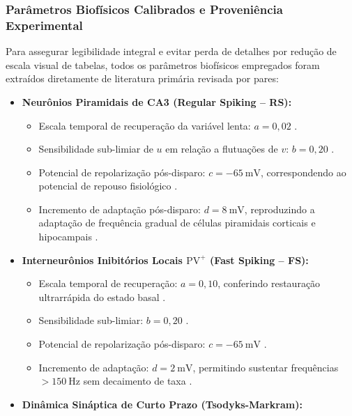 \documentclass[11pt,a4paper,article,brazil]{abntex2}
\begin{document}
\subsubsection{Parâmetros Biofísicos Calibrados e Proveniência Experimental}
\label{sec:parametros_biofisicos}
Para assegurar legibilidade integral e evitar perda de detalhes por redução de escala visual de tabelas, todos os parâmetros biofísicos empregados foram extraídos diretamente de literatura primária revisada por pares:
\begin{itemize}
    \item \textbf{Neurônios Piramidais de CA3 (Regular Spiking -- RS):}
          \begin{itemize}
              \item Escala temporal de recuperação da variável lenta: $a = 0{,}02$ \cite{izhikevich2003}.
              \item Sensibilidade sub-limiar de $u$ em relação a flutuações de $v$: $b = 0{,}20$ \cite{izhikevich2003}.
              \item Potencial de repolarização pós-disparo: $c = \qty{-65}{\milli\volt}$, correspondendo ao potencial de repouso fisiológico \cite{izhikevich2003}.
              \item Incremento de adaptação pós-disparo: $d = \qty{8}{\milli\volt}$, reproduzindo a adaptação de frequência gradual de células piramidais corticais e hipocampais \cite{izhikevich2003}.
          \end{itemize}
    \item \textbf{Interneurônios Inibitórios Locais \texorpdfstring{$\text{PV}^+$}{PV+} (Fast Spiking -- FS):}
          \begin{itemize}
              \item Escala temporal de recuperação: $a = 0{,}10$, conferindo restauração ultrarrápida do estado basal \cite{izhikevich2003}.
              \item Sensibilidade sub-limiar: $b = 0{,}20$ \cite{izhikevich2003}.
              \item Potencial de repolarização pós-disparo: $c = \qty{-65}{\milli\volt}$ \cite{izhikevich2003}.
              \item Incremento de adaptação: $d = \qty{2}{\milli\volt}$, permitindo sustentar frequências $> \qty{150}{\hertz}$ sem decaimento de taxa \cite{izhikevich2003}.
          \end{itemize}
    \item \textbf{Dinâmica Sináptica de Curto Prazo (Tsodyks-Markram):}

\end{itemize}
\end{document}
